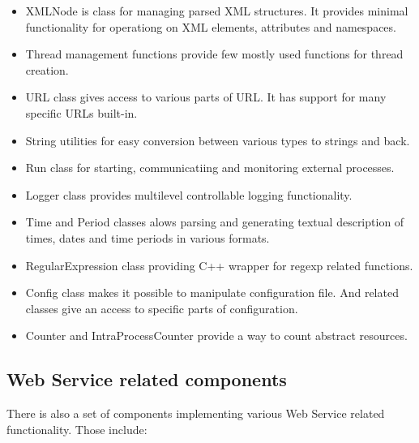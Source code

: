 \documentclass{book}
\begin{document}
\begin{itemize}

\item XMLNode is class for managing parsed XML structures. It provides minimal functionality for operationg on XML elements, attributes and namespaces.

\item Thread management functions provide few mostly used functions for thread creation.

\item URL class gives access to various parts of URL. It has support for many specific URLs built-in.

\item String utilities for easy conversion between various types to strings and back.

\item Run class for starting, communicatiing and monitoring external processes.

\item Logger class provides multilevel controllable logging functionality.

\item Time and Period classes alows parsing and generating textual description of times, dates and time periods in various formats.

\item RegularExpression class providing C++ wrapper for regexp related functions.

\item Config class makes it possible to manipulate configuration file. And related classes give an access to specific parts of configuration.

\item Counter and IntraProcessCounter provide a way to count abstract resources.

\end{itemize}


\subsection{Web Service related components}

There is also a set of components implementing various Web Service related functionality. Those include:
\end{document}
